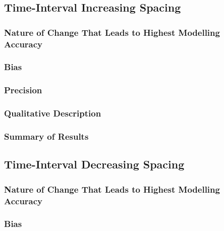 \documentclass[
12pt, %
twoside,
english]{guelphthesis}
\begin{document}
\hypertarget{time-interval-increasing-spacing}{%
\subsection{Time-Interval Increasing Spacing}\label{time-interval-increasing-spacing}}

\hypertarget{nature-change-time-inc-exp1}{%
\subsubsection{Nature of Change That Leads to Highest Modelling Accuracy}\label{nature-change-time-inc-exp1}}

\hypertarget{bias-time-inc-exp1}{%
\subsubsection{Bias}\label{bias-time-inc-exp1}}

\hypertarget{precision-time-inc-exp1}{%
\subsubsection{Precision}\label{precision-time-inc-exp1}}

\hypertarget{qualitative-time-inc-exp1}{%
\subsubsection{Qualitative Description}\label{qualitative-time-inc-exp1}}

\hypertarget{summary-of-results-1}{%
\subsubsection{Summary of Results}\label{summary-of-results-1}}

\hypertarget{time-interval-decreasing-spacing}{%
\subsection{Time-Interval Decreasing Spacing}\label{time-interval-decreasing-spacing}}

\hypertarget{nature-change-time-dec-exp1}{%
\subsubsection{Nature of Change That Leads to Highest Modelling Accuracy}\label{nature-change-time-dec-exp1}}

\hypertarget{bias-time-dec-exp1}{%
\subsubsection{Bias}\label{bias-time-dec-exp1}}
\end{document}
